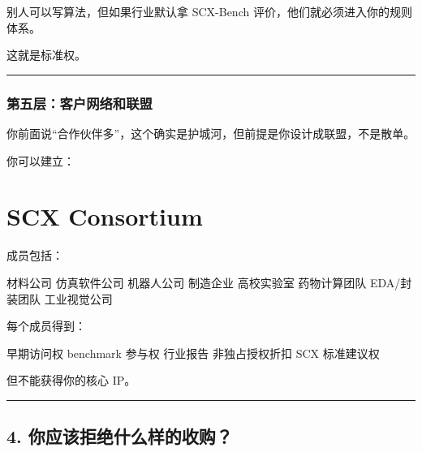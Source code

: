\documentclass[
  12pt,
]{ctexart}
\newenvironment{Shaded}{}{}
\newcommand{\NormalTok}[1]{#1}
\begin{document}
别人可以写算法，但如果行业默认拿 SCX-Bench
评价，他们就必须进入你的规则体系。

这就是标准权。

\begin{center}\rule{0.5\linewidth}{0.5pt}\end{center}

\subsubsection{第五层：客户网络和联盟}\label{ux7b2cux4e94ux5c42ux5ba2ux6237ux7f51ux7edcux548cux8054ux76df}

你前面说``合作伙伴多''，这个确实是护城河，但前提是你设计成联盟，不是散单。

你可以建立：

\section{\texorpdfstring{\textbf{SCX
Consortium}}{SCX Consortium}}\label{scx-consortium}

成员包括：

\begin{Shaded}
\begin{Highlighting}[]
\NormalTok{材料公司}
\NormalTok{仿真软件公司}
\NormalTok{机器人公司}
\NormalTok{制造企业}
\NormalTok{高校实验室}
\NormalTok{药物计算团队}
\NormalTok{EDA/封装团队}
\NormalTok{工业视觉公司}
\end{Highlighting}
\end{Shaded}

每个成员得到：

\begin{Shaded}
\begin{Highlighting}[]
\NormalTok{早期访问权}
\NormalTok{benchmark 参与权}
\NormalTok{行业报告}
\NormalTok{非独占授权折扣}
\NormalTok{SCX 标准建议权}
\end{Highlighting}
\end{Shaded}

但不能获得你的核心 IP。

\begin{center}\rule{0.5\linewidth}{0.5pt}\end{center}

\subsection{4.
你应该拒绝什么样的收购？}\label{ux4f60ux5e94ux8be5ux62d2ux7eddux4ec0ux4e48ux6837ux7684ux6536ux8d2d}
\end{document}
